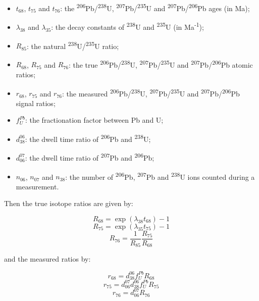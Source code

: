\documentclass[gchron, manuscript]{copernicus}
\begin{document}
\begin{itemize}
\item $t_{68}$, $t_{75}$ and $t_{76}$: the
  \textsuperscript{206}Pb/\textsuperscript{238}U,
  \textsuperscript{207}Pb/\textsuperscript{235}U and
  \textsuperscript{207}Pb/\textsuperscript{206}Pb ages (in Ma);
\item $\lambda_{38}$ and $\lambda_{35}$: the decay constants of
  \textsuperscript{238}U and \textsuperscript{235}U (in
  Ma\textsuperscript{-1});
\item $R_{85}$: the natural
  \textsuperscript{238}U/\textsuperscript{235}U ratio;
\item $R_{68}$, $R_{75}$ and $R_{76}$: the true
  \textsuperscript{206}Pb/\textsuperscript{238}U,
  \textsuperscript{207}Pb/\textsuperscript{235}U and
  \textsuperscript{207}Pb/\textsuperscript{206}Pb atomic ratios;
\item $r_{68}$, $r_{75}$ and $r_{76}$: the measured
  \textsuperscript{206}Pb/\textsuperscript{238}U,
  \textsuperscript{207}Pb/\textsuperscript{235}U and
  \textsuperscript{207}Pb/\textsuperscript{206}Pb signal ratios;
\item $f^{Pb}_{U}$: the fractionation factor between Pb and U;
\item $d^{06}_{38}$: the dwell time ratio of \textsuperscript{206}Pb
  and \textsuperscript{238}U;
\item $d^{07}_{06}$: the dwell time ratio of \textsuperscript{207}Pb
  and \textsuperscript{206}Pb;
\item $n_{06}$, $n_{07}$ and $n_{38}$: the number of
  \textsuperscript{206}Pb, \textsuperscript{207}Pb and
  \textsuperscript{238}U ions counted during a measurement.
\end{itemize}

Then the true isotope ratios are given by:

\begin{equation}
  R_{68} = \exp(\lambda_{38}t_{68})-1
\end{equation}
\begin{equation}
  R_{75} = \exp(\lambda_{35}t_{75})-1
\end{equation}
\begin{equation}  
   R_{76} = \frac{1}{R_{85}}\frac{R_{75}}{R_{68}}
\end{equation}

and the measured ratios by:

\begin{equation}
    r_{68} = d^{06}_{38}f^{Pb}_{U}R_{68}
\end{equation}
\begin{equation}
    r_{75} = d^{07}_{06}d^{06}_{38}f^{Pb}_{U}R_{75}
\end{equation}
\begin{equation}  
    r_{76} = d^{07}_{06}R_{76}
\end{equation}
\end{document}
